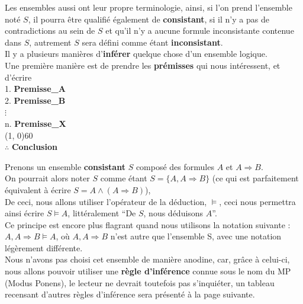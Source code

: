\documentclass[a4paper, 12pt]{article}
\newcommand{\imply}{\Rightarrow}
\numberwithin{equation}{subsection}
\begin{document}
  Les ensembles aussi ont leur propre terminologie, ainsi, si l'on prend l'ensemble noté $S$, il pourra être qualifié également de {\bf consistant}, si il n'y a pas de contradictions au sein de $S$ et qu'il n'y a aucune formule inconsistante contenue dans $S$, autrement $S$ sera défini comme étant {\bf inconsistant}. \\[0.5cm]
  Il y a plusieurs manières d'{\bf inférer} quelque chose d'un ensemble logique. \\

  Une première manière est de prendre les {\bf prémisses} qui nous intéressent, et d'écrire \\[0.5cm]
    1. {\bf Premisse\_A} \\
    2. {\bf Premisse\_B} \\
    \hspace{0.2cm}$\vdots$ \\
    n. {\bf Premisse\_X} \\
    \hspace{0.5cm}\line(1, 0){60} \\
    $\therefore$ {\bf Conclusion} \

    Prenons un ensemble {\bf consistant} $S$ composé des formules $A$ et $A \imply B$. \\

    On pourrait alors noter $S$ comme étant $S = \{ A, A \imply B \}$ (ce qui est parfaitement équivalent à écrire $S = A \land (A \imply B)$), \\

    De ceci, nous allons utiliser l'opérateur de la déduction, $\vDash$, ceci nous permettra ainsi écrire $S \vDash A$, littéralement ``De $S$, nous déduisons $A$''. \\

    Ce principe est encore plus flagrant quand nous utilisons la notation suivante : $A, A \imply B \models A$, où $A, A \imply B$ n'est autre que l'ensemble S, avec une notation légèrement différente. \\

    Nous n'avons pas choisi cet ensemble de manière anodine, car, grâce à celui-ci, nous allons pouvoir utiliser une {\bf règle d'inférence} connue sous le nom du MP (Modus Ponens), le lecteur ne devrait toutefois pas s'inquiéter, un tableau recensant d'autres règles d'inférence sera présenté à la page suivante. \\
\end{document}
